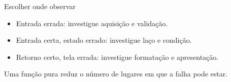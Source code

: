 \begin{frame}{Escolher onde observar}
\begin{center}
\end{center}
\begin{itemize}
\item Entrada errada: investigue aquisição e validação.
\item Entrada certa, estado errado: investigue laço e condição.
\item Retorno certo, tela errada: investigue formatação e apresentação.
\end{itemize}
\small Uma função pura reduz o número de lugares em que a falha pode estar.
\end{frame}
